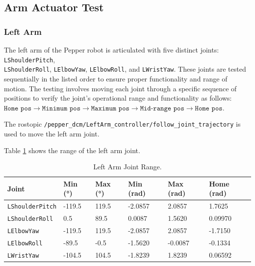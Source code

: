 \documentclass{CSSRforAfrica}
\begin{document}
\subsection{Arm Actuator Test}
\subsubsection*{Left Arm}
The left arm of the Pepper robot is articulated with five distinct joints: \texttt{LShoulderPitch},\\
\texttt{LShoulderRoll}, \texttt{LElbowYaw}, \texttt{LElbowRoll}, and
\texttt{LWristYaw}. These joints are tested sequentially in the listed order to ensure proper functionality and range of motion. The testing involves moving each joint through a specific sequence of positions to verify the joint's operational range and functionality as follows:\\
$ \texttt{Home pos} \rightarrow \texttt{Minimum pos} \rightarrow \texttt{Maximum pos} \rightarrow \texttt{Mid-range pos} \rightarrow \texttt{Home pos}$.

The rostopic \texttt{/pepper\_dcm/LeftArm\_controller/follow\_joint\_trajectory} is used to move the 
left arm joint.

Table \ref{tab:left_arm_joint_range} shows the range of the left arm joint.


\begin{longtable}[c]{|l|l|l|l|l|l|} 
    \caption{Left Arm Joint Range.\cite{PepperJoints}} \label{tab:left_arm_joint_range}\\
    \hline
    \rowcolor{gray!30}
    \textbf{Joint} & \textbf{Min (°)} & \textbf{Max (°)} & \textbf{Min (rad)} & \textbf{Max (rad)}  & \textbf{Home (rad)} \\ \hline
    \endhead %
    
    \texttt{LShoulderPitch} & -119.5 & 119.5 & -2.0857 & 2.0857 & 1.7625 \\ \hline
    \texttt{LShoulderRoll} & 0.5 & 89.5 & 0.0087 & 1.5620 & 0.09970 \\ \hline
    \texttt{LElbowYaw} & -119.5 & 119.5 & -2.0857 & 2.0857 & -1.7150 \\ \hline
    \texttt{LElbowRoll} & -89.5 & -0.5 & -1.5620 & -0.0087 &  -0.1334 \\ \hline
    \texttt{LWristYaw} & -104.5 & 104.5 & -1.8239 & 1.8239 & 0.06592 \\ \hline

\end{longtable}
\end{document}
